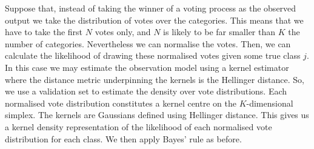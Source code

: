 \documentclass[10pt,a4paper,final]{article}
\begin{document}
Suppose that, instead of taking the winner of a voting process as the observed output we take the distribution of votes over the categories. This means that we have to take the first $N$ votes only, and $N$ is likely to be far smaller than $K$ the number of categories. Nevertheless we can normalise the votes. Then, we can calculate the likelihood of drawing these normalised votes given some true class $j$. In this case we may estimate the observation model using a kernel estimator where the distance metric underpinning the kernels is the Hellinger distance. So, we use a validation set to estimate the density over vote distributions. Each normalised vote distribution constitutes a kernel centre on the $K$-dimensional simplex. The kernels are Gaussians defined using Hellinger distance. This gives us a kernel density representation of the likelihood of each normalised vote distribution for each class. We then apply Bayes' rule as before.
%
%
%
%
%
\end{document}
